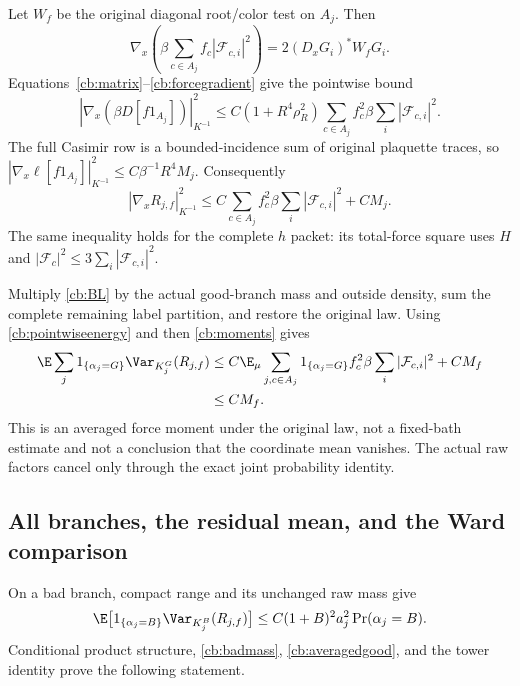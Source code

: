 Let \(W_f\) be the original diagonal root/color test on \(A_j\). Then
\[
 \nabla_x\left(\beta\sum_{c\in A_j}f_c|\mathcal F_{c,i}|^2\right)
       =2(D_xG_i)^*W_fG_i.
\]
Equations~\eqref{cb:matrix}--\eqref{cb:forcegradient} give the pointwise bound
\[
 |\nabla_x(\beta D[f1_{A_j}])|_{K^{-1}}^2
 \le C(1+R^4\rho_R^2)
          \sum_{c\in A_j}f_c^2\beta\sum_i|\mathcal F_{c,i}|^2.
\]
The full Casimir row is a bounded-incidence sum of original plaquette traces, so
\( |\nabla_x\ell[f1_{A_j}]|_{K^{-1}}^2\le C\beta^{-1}R^4M_j\).
Consequently
\begin{equation}
 |\nabla_xR_{j,f}|_{K^{-1}}^2
 \le C\sum_{c\in A_j}f_c^2\beta\sum_i|\mathcal F_{c,i}|^2+CM_j.
 \label{cb:pointwiseenergy}
\end{equation}
The same inequality holds for the complete \(h\) packet: its total-force square uses \(H\) and \(|\mathcal F_c|^2\le3\sum_i|\mathcal F_{c,i}|^2\).

Multiply \eqref{cb:BL} by the actual good-branch mass and outside density, sum the complete remaining label partition, and restore the original law. Using \eqref{cb:pointwiseenergy} and then \eqref{cb:moments} gives
\begin{align}
 \E\sum_j1_{\{\alpha_j=G\}}\Var_{K_j^G}(R_{j,f})
 &\le C\E_\mu\sum_{j,c\in A_j}1_{\{\alpha_j=G\}}
                  f_c^2\beta\sum_i|\mathcal F_{c,i}|^2+CM_f\notag\\
 &\le CM_f.
 \label{cb:averagedgood}
\end{align}
This is an averaged force moment under the original law, not a fixed-bath estimate and not a conclusion that the coordinate mean vanishes. The actual raw factors cancel only through the exact joint probability identity.

\subsection{All branches, the residual mean, and the Ward comparison}

On a bad branch, compact range and its unchanged raw mass give
\[
 \E\bigl[1_{\{\alpha_j=B\}}\Var_{K_j^B}(R_{j,f})\bigr]
 \le C(1+B)^2a_j^2\Pr(\alpha_j=B).
\]
Conditional product structure, \eqref{cb:badmass}, \eqref{cb:averagedgood}, and the tower identity prove the following statement.

